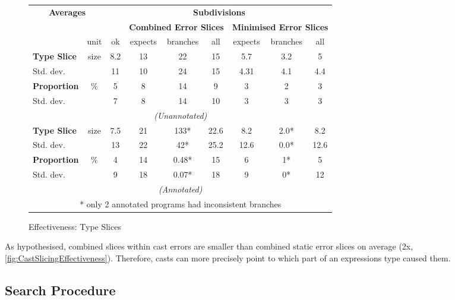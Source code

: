 \begin{figure}[h]
  \centering
  \begin{tabular}{lc|c|ccc|ccc}
  \multicolumn{2}{c}{\textbf{Averages}} & \multicolumn{7}{c}{\textbf{Subdivisions}}\\
  & & & \multicolumn{3}{c|}{\textbf{Combined Error Slices}} & \multicolumn{3}{c}{\textbf{Minimised Error Slices}}\\ 
   & unit & ok & expects & branches & all & expects & branches & all\\
   \hline
   \textbf{Type Slice} & size &  8.2 & 13 & 22 & 15&  5.7 & 3.2 & 5 \\
   Std. dev. &  				 &  11 & 10 & 24 & 15&    4.31 & 4.1 & 4.4 \\
   \textbf{Proportion}& \%    & 5 & 8 & 14 & 9&        3  & 2 & 3 \\
   Std. dev. &  				 &  7 & 8 & 14 & 10&      3 & 3 & 3 \\
   \multicolumn{9}{c}{\textit{(Unannotated)}}\\
   \textbf{Type Slice} & size &  7.5 & 21 & 133* & 22.6 &8.2&  2.0* & 8.2  \\
   Std. dev. 			&    &  13 & 22 & 42* & 25.2& 12.6&  0.0* & 12.6  \\
   \textbf{Proportion}& \% 	 & 4 & 14 & 0.48* & 15&  6&    1* & 5  \\
   Std. dev. &  				 &  9 & 18 & 0.07* & 18&   9&    0* & 12  \\
   \multicolumn{9}{c}{\textit{(Annotated)}}\\
   \multicolumn{9}{c}{* only 2 annotated programs had inconsistent branches}
  \end{tabular}
  \caption{Effectiveness: Type Slices}
\label{fig:TypeSlicingEffectiveness}
\end{figure}
As hypothesised, combined slices within cast errors are smaller than combined static error slices on average (2x, \cref{fig:CastSlicingEffectiveness}). Therefore, casts can more precisely point to which part of an expressions type caused them.



\subsection{Search Procedure}

